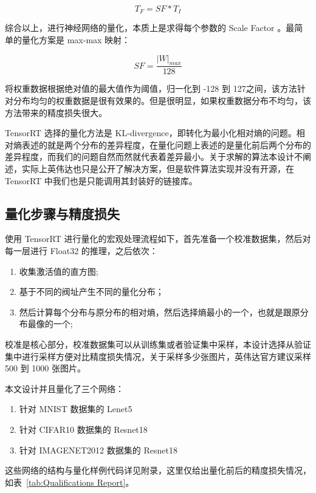 $$ T_F = SF * T_I $$

综合以上，进行神经网络的量化，本质上是求得每个参数的 Scale Factor 。最简单的量化方案是 max-max 映射：

$$ SF = \frac{|W|_{max}}{128} $$

将权重数据根据绝对值的最大值作为阈值，归一化到 -128 到 127之间，该方法针对分布均匀的权重数据是很有效果的。但是很明显，如果权重数据分布不均匀，该方法带来的精度损失很大。

TensorRT 选择的量化方法是 KL-divergence，即转化为最小化相对熵的问题。相对熵表述的就是两个分布的差异程度，在量化问题上表述的是量化前后两个分布的差异程度，而我们的问题自然而然就代表着差异最小。关于求解的算法本设计不阐述，实际上英伟达也只是公开了解决方案，但是软件算法实现并没有开源，在 TensorRT 中我们也是只能调用其封装好的链接库。

\subsection{量化步骤与精度损失}

使用 TensorRT 进行量化的宏观处理流程如下，首先准备一个校准数据集，然后对每一层进行 Float32 的推理，之后依次：

\begin{enumerate}
    \item 收集激活值的直方图;
    \item 基于不同的阀址产生不同的量化分布；
    \item 然后计算每个分布与原分布的相对熵，然后选择熵最小的一个，也就是跟原分布最像的一个;
\end{enumerate}

校准是核心部分，校准数据集可以从训练集或者验证集中采样，本设计选择从验证集中进行采样方便对比精度损失情况，关于采样多少张图片，英伟达官方建议采样 500 到 1000 张图片。

本文设计并且量化了三个网络：

\begin{enumerate}
    \item 针对 MNIST 数据集的 Lenet5
    \item 针对 CIFAR10 数据集的 Resnet18
    \item 针对 IMAGENET2012 数据集的 Resnet18
\end{enumerate}

这些网络的结构与量化样例代码详见附录，这里仅给出量化前后的精度损失情况，如表~\ref{tab:Qualifications Report}。

